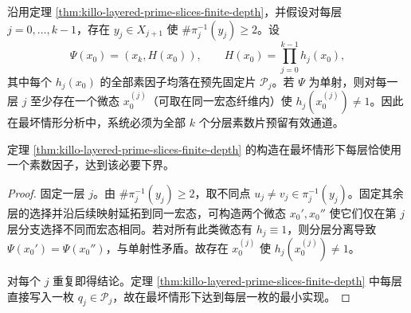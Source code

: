 \begin{corollary}[分层外置的最坏情形必要性与最小实现]\label{cor:killo-layered-necessity-minimality}
沿用定理 \ref{thm:killo-layered-prime-slices-finite-depth}，并假设对每层 \(j=0,\dots,k-1\)，存在 \(y_j\in X_{j+1}\) 使 \(\#\pi_j^{-1}(y_j)\ge 2\)。设
\[
\Psi(x_0)=(x_k,H(x_0)),\qquad
H(x_0)=\prod_{j=0}^{k-1}h_j(x_0),
\]
其中每个 \(h_j(x_0)\) 的全部素因子均落在预先固定片 \(\mathcal P_j\)。若 \(\Psi\) 为单射，则对每一层 \(j\) 至少存在一个微态 \(x_0^{(j)}\)（可取在同一宏态纤维内）使 \(h_j(x_0^{(j)})\neq 1\)。因此在最坏情形分析中，系统必须为全部 \(k\) 个分层素数片预留有效通道。

定理 \ref{thm:killo-layered-prime-slices-finite-depth} 的构造在最坏情形下每层恰使用一个素数因子，达到该必要下界。
\end{corollary}
\begin{proof}
固定一层 \(j\)。由 \(\#\pi_j^{-1}(y_j)\ge 2\)，取不同点 \(u_j\neq v_j\in\pi_j^{-1}(y_j)\)。固定其余层的选择并沿后续映射延拓到同一宏态，可构造两个微态 \(x_0',x_0''\) 使它们仅在第 \(j\) 层分支选择不同而宏态相同。若对所有此类微态有 \(h_j\equiv 1\)，则分层分离导致 \(\Psi(x_0')=\Psi(x_0'')\)，与单射性矛盾。故存在 \(x_0^{(j)}\) 使 \(h_j(x_0^{(j)})\neq 1\)。

对每个 \(j\) 重复即得结论。定理 \ref{thm:killo-layered-prime-slices-finite-depth} 中每层直接写入一枚 \(q_j\in\mathcal P_j\)，故在最坏情形下达到每层一枚的最小实现。
\end{proof}

